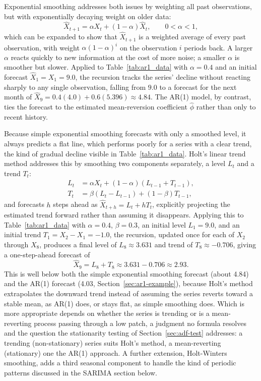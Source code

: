 \documentclass[../ai_in_finance]{subfiles}
\begin{document}
Exponential smoothing addresses both issues by weighting all past observations, but with exponentially decaying weight on older data:
\begin{equation*}
\hat X_{t+1} = \alpha X_t + (1-\alpha)\hat X_t, \qquad 0 < \alpha < 1,
\end{equation*}
which can be expanded to show that $\hat X_{t+1}$ is a weighted average of every past observation, with weight $\alpha(1-\alpha)^i$ on the observation $i$ periods back.
A larger $\alpha$ reacts quickly to new information at the cost of more noise; a smaller $\alpha$ is smoother but slower. Applied to Table~\ref{tab:ar1_data} with $\alpha = 0.4$ and an initial forecast $\hat X_1 = X_1 = 9.0$, the recursion tracks the series' decline without reacting sharply to any single observation, falling from $9.0$ to a forecast for the next month of $\hat X_9 = 0.4(4.0) + 0.6(5.396) \approx 4.84$. The AR(1) model, by contrast, ties the forecast to the estimated mean-reversion coefficient $\hat\phi$ rather than only to recent history.

Because simple exponential smoothing forecasts with only a smoothed level, it always predicts a flat line, which performs poorly for a series with a clear trend, the kind of gradual decline visible in Table~\ref{tab:ar1_data}. Holt's linear trend method addresses this by smoothing two components separately, a level $L_t$ and a trend $T_t$:
\begin{align*}
L_t &= \alpha X_t + (1-\alpha)(L_{t-1} + T_{t-1}), \\
T_t &= \beta (L_t - L_{t-1}) + (1-\beta) T_{t-1},
\end{align*}
and forecasts $h$ steps ahead as $\hat X_{t+h} = L_t + h T_t$, explicitly projecting the estimated trend forward rather than assuming it disappears. Applying this to Table~\ref{tab:ar1_data} with $\alpha=0.4$, $\beta=0.3$, an initial level $L_1=9.0$, and an initial trend $T_1 = X_2 - X_1 = -1.0$, the recursion, updated once for each of $X_2$ through $X_8$, produces a final level of $L_8 \approx 3.631$ and trend of $T_8 \approx -0.706$, giving a one-step-ahead forecast of
\begin{equation*}
\hat X_9 = L_8 + T_8 \approx 3.631 - 0.706 \approx 2.93.
\end{equation*}
This is well below both the simple exponential smoothing forecast (about 4.84) and the AR(1) forecast (4.03, Section~\ref{sec:ar1-example}), because Holt's method extrapolates the downward trend instead of assuming the series reverts toward a stable mean, as AR(1) does, or stays flat, as simple smoothing does.
Which is more appropriate depends on whether the series is trending or is a mean-reverting process passing through a low patch, a judgment no formula resolves and the question the stationarity testing of Section~\ref{sec:adf-test} addresses: a trending (non-stationary) series suits Holt's method, a mean-reverting (stationary) one the AR(1) approach. A further extension, Holt-Winters smoothing, adds a third seasonal component to handle the kind of periodic patterns discussed in the SARIMA section below.
\end{document}
